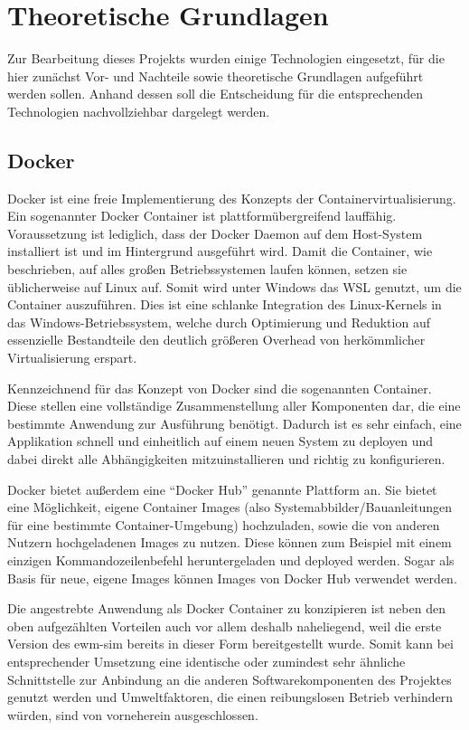 \chapter{Theoretische Grundlagen}
Zur Bearbeitung dieses Projekts wurden einige Technologien eingesetzt, für die hier zunächst Vor- und Nachteile sowie theoretische Grundlagen aufgeführt werden sollen.
Anhand dessen soll die Entscheidung für die entsprechenden Technologien nachvollziehbar dargelegt werden.

\section{Docker}
Docker ist eine freie Implementierung des Konzepts der Containervirtualisierung.
Ein sogenannter Docker Container ist plattformübergreifend lauffähig.
Voraussetzung ist lediglich, dass der Docker Daemon auf dem Host-System installiert ist und im Hintergrund ausgeführt wird.
Damit die Container, wie beschrieben, auf alles großen Betriebssystemen laufen können, setzen sie üblicherweise auf Linux auf.
Somit wird unter Windows das \ac{WSL} genutzt, um die Container auszuführen.
Dies ist eine schlanke Integration des Linux-Kernels in das Windows-Betriebssystem, welche durch Optimierung und Reduktion auf essenzielle Bestandteile den deutlich größeren Overhead von herkömmlicher Virtualisierung erspart.

Kennzeichnend für das Konzept von Docker sind die sogenannten Container.
Diese stellen eine vollständige Zusammenstellung aller Komponenten dar, die eine bestimmte Anwendung zur Ausführung benötigt.
Dadurch ist es sehr einfach, eine Applikation schnell und einheitlich auf einem neuen System zu deployen und dabei direkt alle Abhängigkeiten mitzuinstallieren und richtig zu konfigurieren.

Docker bietet außerdem eine \enquote{Docker Hub} genannte Plattform an.
Sie bietet eine Möglichkeit, eigene Container Images (also Systemabbilder/Bauanleitungen für eine bestimmte Container-Umgebung) hochzuladen, sowie die von anderen Nutzern hochgeladenen Images zu nutzen.
Diese können zum Beispiel mit einem einzigen Kommandozeilenbefehl heruntergeladen und deployed werden. Sogar als Basis für neue, eigene Images können Images von Docker Hub verwendet werden.

Die angestrebte Anwendung als Docker Container zu konzipieren ist neben den oben aufgezählten Vorteilen auch vor allem deshalb naheliegend, weil die erste Version des \ac{ewm-sim} bereits in dieser Form bereitgestellt wurde.
Somit kann bei entsprechender Umsetzung eine identische oder zumindest sehr ähnliche Schnittstelle zur Anbindung an die anderen Softwarekomponenten des Projektes genutzt werden und Umweltfaktoren, die einen reibungslosen Betrieb verhindern würden, sind von vorneherein ausgeschlossen.


